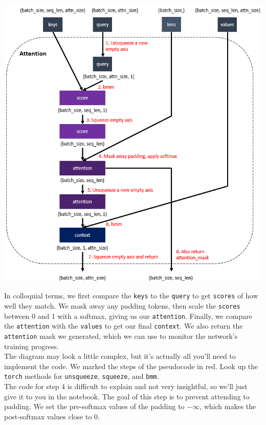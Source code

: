 \documentclass{article}
\newcommand{\ttt}[1]{\texttt{#1}}
\begin{document}
\begin{center}
\includegraphics[scale=0.9]{images/attention.png}
\end{center}

In colloquial terms, we first compare the \ttt{keys} to the \ttt{query} to get \ttt{scores} of how well they match. We mask away any padding tokens, then scale the \ttt{scores} between 0 and 1 with a softmax, giving us our \ttt{attention}. Finally, we compare the \ttt{attention} with the \ttt{values} to get our final \ttt{context}. We also return the \ttt{attention} mask we generated, which we can use to monitor the network's training progress. \\

The diagram may look a little complex, but it's actually all you'll need to implement the code. We marked the steps of the pseudocode in red. Look up the \ttt{torch} methods for \ttt{unsqueeze}, \ttt{squeeze}, and \ttt{bmm}. \\

The code for step 4 is difficult to explain and not very insightful, so we'll just give it to you in the notebook. The goal of this step is to prevent attending to padding. We set the pre-softmax values of the padding to $-\infty$, which makes the post-softmax values close to 0. \\
\end{document}
